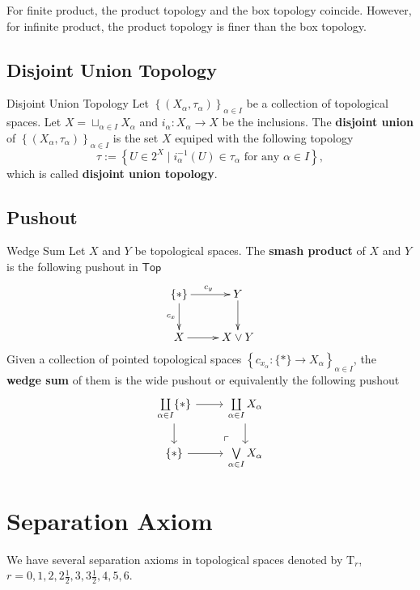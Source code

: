 \documentclass{report}
\newcommand{\Top}{\mathsf{Top}}
\begin{document}
For finite product, the product topology and the box topology coincide. However, for infinite product, the product topology is finer than the box topology.

\subsection{Disjoint Union Topology}
\begin{definition}{Disjoint Union Topology}{}
	Let $\left\{(X_\alpha,\tau_\alpha)\right\}_{\alpha\in I}$ be a collection of topological spaces. Let $X=\sqcup_{\alpha\in I}X_\alpha$ and $i_\alpha:X_\alpha\to X$ be the inclusions. The \textbf{disjoint union} of $\left\{(X_\alpha,\tau_\alpha)\right\}_{\alpha\in I}$ is the set $X$ equiped with the following topology
	\[
		\tau:=\left\{U\in 2^{X}\mid i_{\alpha}^{-1}(U)\in \tau_\alpha\text{ for any }\alpha\in I\right\},
	\]
	which is called \textbf{disjoint union topology}.
\end{definition}


\subsection{Pushout}


\begin{definition}{Wedge Sum}{}
	Let $X$ and $Y$ be topological spaces. The \textbf{smash product} of $X$ and $Y$ is the following pushout in $\Top$
	\[\xymatrix{
			\{*\}\ar[r]^{c_y}\ar[d]_{c_x}  &Y\ar[d]_{}\\
			X\ar@{->}[r]_{}&X\vee Y
		}\]
	Given a collection of pointed topological spaces $\left\{c_{x_\alpha}:\{*\}\to X_\alpha\right\}_{\alpha\in I}$, the \textbf{wedge sum} of them is the wide pushout or equivalently the following pushout
	\[
		\begin{tikzcd}[ampersand replacement=\&]
			\coprod\limits_{\alpha\in I} \{*\} \arrow[r] \arrow[d] \& \coprod\limits_{\alpha\in I} X_{\alpha} \arrow[d] \\
			\{*\} \arrow[r] \& \bigvee\limits_{\alpha\in I} X_\alpha \arrow[ul, phantom, "\ulcorner", very near start]
		\end{tikzcd}
	\]
\end{definition}

\section{Separation Axiom}

We have several separation axioms in topological spaces denoted by $\mathrm{T}_r$, $r=0,1,2,2\frac{1}{2},3,3\frac{1}{2},4,5,6$.
\end{document}
